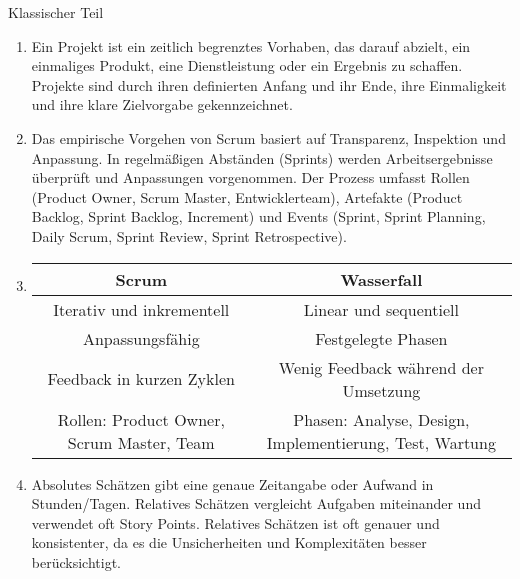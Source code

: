 \documentclass{article}
\begin{document}
\begin{exercise}{Klassischer Teil}
  \begin{solution}
    \begin{enumerate}
      \item Ein Projekt ist ein zeitlich begrenztes Vorhaben, das darauf abzielt, ein einmaliges Produkt, eine Dienstleistung oder ein Ergebnis zu schaffen. Projekte sind durch ihren definierten Anfang und ihr Ende, ihre Einmaligkeit und ihre klare Zielvorgabe gekennzeichnet.
      \item Das empirische Vorgehen von Scrum basiert auf Transparenz, Inspektion und Anpassung. In regelmäßigen Abständen (Sprints) werden Arbeitsergebnisse überprüft und Anpassungen vorgenommen. Der Prozess umfasst Rollen (Product Owner, Scrum Master, Entwicklerteam), Artefakte (Product Backlog, Sprint Backlog, Increment) und Events (Sprint, Sprint Planning, Daily Scrum, Sprint Review, Sprint Retrospective).
      \item
            \begin{tabular}{|c|c|}
              \hline
              \textbf{Scrum}                            & \textbf{Wasserfall}                                     \\
              \hline
              Iterativ und inkrementell                 & Linear und sequentiell                                  \\
              Anpassungsfähig                           & Festgelegte Phasen                                      \\
              Feedback in kurzen Zyklen                 & Wenig Feedback während der Umsetzung                    \\
              Rollen: Product Owner, Scrum Master, Team & Phasen: Analyse, Design, Implementierung, Test, Wartung \\
              \hline
            \end{tabular}
      \item Absolutes Schätzen gibt eine genaue Zeitangabe oder Aufwand in Stunden/Tagen. Relatives Schätzen vergleicht Aufgaben miteinander und verwendet oft Story Points. Relatives Schätzen ist oft genauer und konsistenter, da es die Unsicherheiten und Komplexitäten besser berücksichtigt.
    \end{enumerate}
  \end{solution}
\end{exercise}
\end{document}
